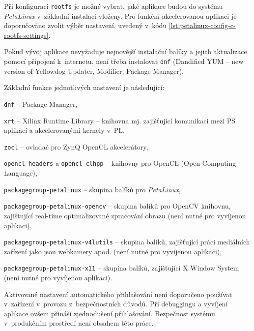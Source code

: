 \documentclass[a4paper, twoside, 11pt]{article}
\begin{document}
		Při konfiguraci \texttt{rootfs} je možné vybrat, jaké aplikace budou do systému \textit{PetaLinux} v~základní instalaci vloženy. Pro funkční akcelerovanou aplikaci je doporučováno zvolit výběr nastavení, uvedený v~kódu \ref{lst:petalinux-config-c-rootfs-settings}.\par
		Pokud vývoj aplikace nevyžaduje nejnovější instalační balíky a jejich aktualizace pomocí připojení k~internetu, není třeba instalovat \texttt{dnf} (Dandified YUM – new version of Yellowdog Updater, Modifier, Package Manager).\par
		Základní funkce jednotlivých nastavení je následující:
		\vspace*{0.25cm}
		\begin{description}
			\item \texttt{dnf} – Package Manager,
			\item \texttt{xrt} – Xilinx Runtime Library – knihovna mj. zajišťující komunikaci mezi PS aplikací a akcelerovanými kernely v~PL,
			\item \texttt{zocl} – ovladač pro ZynQ OpenCL akcelerátory,
			\item \texttt{opencl-headers} a \texttt{opencl-clhpp} – knihovny pro OpenCL (Open Computing Language),
			\item \texttt{packagegroup-petalinux} – skupina balíků pro \textit{PetaLinux},
			\item \texttt{packagegroup-petalinux-opencv} – skupina balíků pro OpenCV knihovnu, zajištující real-time optimalizované zpracování obrazu (není nutné pro vyvíjenou aplikaci),
			\item \texttt{packagegroup-petalinux-v4lutils} – skupina balíků, zajišťující práci mediálních zařízení jako jsou webkamery apod. (není nutné pro vyvíjenou aplikaci),
			\item \texttt{packagegroup-petalinux-x11} – skupina balíků, zajišťující X Window System (není nutné pro vyvíjenou aplikaci).
		\end{description}
		\vspace*{0.75cm}
		Aktivované nastavení automatického přihlašování není doporučeno používat v~zařízení v~provozu z~bezpečnostních důvodů. Při debuggingu a vyvíjení aplikace ovšem přináší zjednodušení přihlašování. Bezpečnost systému v~produkčním prostředí není obsahem této práce.\par
\end{document}
